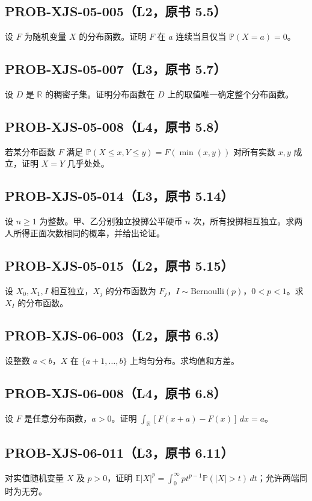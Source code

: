 \documentclass[UTF8]{ctexart}
\begin{document}
\subsection*{PROB-XJS-05-005（L2，原书 5.5）}
设 $F$ 为随机变量 $X$ 的分布函数。证明 $F$ 在 $a$ 连续当且仅当 $\mathbb P(X=a)=0$。

\subsection*{PROB-XJS-05-007（L3，原书 5.7）}
设 $D$ 是 $\mathbb R$ 的稠密子集。证明分布函数在 $D$ 上的取值唯一确定整个分布函数。

\subsection*{PROB-XJS-05-008（L4，原书 5.8）}
若某分布函数 $F$ 满足 $\mathbb P(X\le x,Y\le y)=F(\min(x,y))$ 对所有实数 $x,y$ 成立，证明 $X=Y$ 几乎处处。

\subsection*{PROB-XJS-05-014（L3，原书 5.14）}
设 $n\ge1$ 为整数。甲、乙分别独立投掷公平硬币 $n$ 次，所有投掷相互独立。求两人所得正面次数相同的概率，并给出论证。

\subsection*{PROB-XJS-05-015（L2，原书 5.15）}
设 $X_0,X_1,I$ 相互独立，$X_j$ 的分布函数为 $F_j$，$I\sim\mathrm{Bernoulli}(p)$，$0<p<1$。求 $X_I$ 的分布函数。

\subsection*{PROB-XJS-06-003（L2，原书 6.3）}
设整数 $a<b$，$X$ 在 $\{a+1,\ldots,b\}$ 上均匀分布。求均值和方差。

\subsection*{PROB-XJS-06-008（L4，原书 6.8）}
设 $F$ 是任意分布函数，$a>0$。证明 $\int_{\mathbb R}[F(x+a)-F(x)]\,dx=a$。

\subsection*{PROB-XJS-06-011（L3，原书 6.11）}
对实值随机变量 $X$ 及 $p>0$，证明 $\mathbb E|X|^p=\int_0^\infty pt^{p-1}\mathbb P(|X|>t)\,dt$；允许两端同时为无穷。
\end{document}
